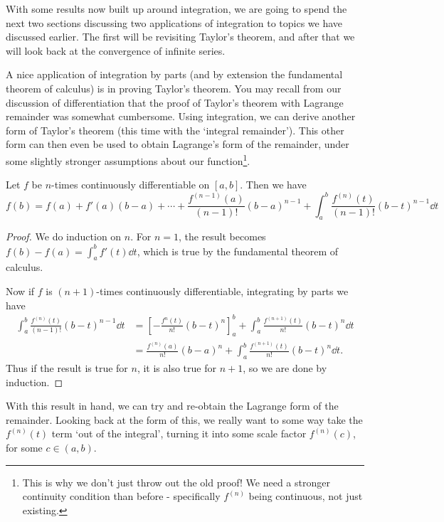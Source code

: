 With some results now built up around integration, we are going to spend the next two sections discussing two applications of integration to topics we have discussed earlier. The first will be revisiting Taylor's theorem, and after that we will look back at the convergence of infinite series.

A nice application of integration by parts (and by extension the fundamental theorem of calculus) is in proving Taylor's theorem.
You may recall from our discussion of differentiation that the proof of Taylor's theorem with Lagrange remainder was somewhat cumbersome. Using integration, we can derive another form of Taylor's theorem (this time with the `integral remainder'). This other form can then even be used to obtain Lagrange's form of the remainder, under some slightly stronger assumptions about our function\footnote{This is why we don't just throw out the old proof! We need a stronger continuity condition than before - specifically $f^{(n)}$ being continuous, not just existing.}.

\begin{theorem}
	Let $f$ be $n$-times continuously differentiable on $[a, b]$. Then we have
	$$
	f(b) = f(a) + f'(a)(b - a) + \cdots + \frac{f^{(n - 1)}(a)}{(n - 1)!} (b - a)^{n - 1} + \int_a^b  \frac{f^{(n)}(t)}{(n - 1)!}(b - t)^{n - 1} \dd t
	$$
\end{theorem}
\begin{proof}
	We do induction on $n$. For $n = 1$, the result becomes $f(b) - f(a) = \int_a^b f'(t) \dd t$, which is true by the fundamental theorem of calculus. 

	Now if $f$ is $(n + 1)$-times continuously differentiable, integrating by parts we have
	\begin{align*}
		\int_a^b \frac{f^{(n)}(t)}{(n - 1)!}(b - t)^{n - 1} \dd t &= \left[- \frac{f^{n}(t)}{n!}(b - t)^n\right]_a^b + \int_a^b \frac{f^{(n + 1)}(t)}{n!} (b - t)^n \dd t \\
		&= \frac{f^{(n)}(a)}{n!}(b - a)^n + \int_a^b \frac{f^{(n + 1)}(t)}{n!} (b - t)^n \dd t.
	\end{align*}
	Thus if the result is true for $n$, it is also true for $n + 1$, so we are done by induction.
\end{proof}

With this result in hand, we can try and re-obtain the Lagrange form of the remainder. Looking back at the form of this, we really want to some way take the $f^{(n)}(t)$ term `out of the integral', turning it into some scale factor $f^{(n)}(c)$, for some $c \in (a, b)$. 

